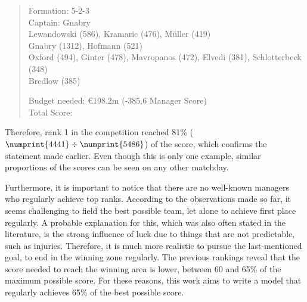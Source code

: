 \begin{quote}
    \centering
    Formation:  5-2-3 \\
    Captain:    Gnabry \\

    Lewandowski (586), Kramaric (476), Müller (419) \\
    Gnabry (1312), Hofmann (521) \\
    Oxford (494), Ginter (478), Mavropanos (472), Elvedi (381), Schlotterbeck (348) \\
    Bredlow (385)

    Budget needed: €198.2m (-385.6 Manager Score) \\
    Total Score: \textbf{}
\end{quote}

Therefore, rank 1 in the competition reached 81\% ($\numprint{4441} \div \numprint{5486}$) of the score, which confirms the statement made earlier. Even though this is only one example, similar proportions of the scores can be seen on any other matchday.

Furthermore, it is important to notice that there are no well-known managers who regularly achieve top ranks. According to the observations made so far, it seems challenging to field the best possible team, let alone to achieve first place regularly. A probable explanation for this, which was also often stated in the literature, is the strong influence of luck due to things that are not predictable, such as injuries. Therefore, it is much more realistic to pursue the last-mentioned goal, to end in the winning zone regularly. The previous rankings reveal that the score needed to reach the winning area is lower, between 60 and 65\% of the maximum possible score. For these reasons, this work aims to write a model that regularly achieves 65\% of the best possible score.

